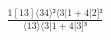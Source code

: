 \documentclass[varwidth, border=5pt]{standalone}
\begin{document}
\begin{my}
$\begin{gathered}
\scriptscriptstyle\frac{1[13]⟨34⟩²⟨3|1+4|2]²}{⟨13⟩⟨3|1+4|3]³}
\end{gathered}$
\end{my}
\end{document}
